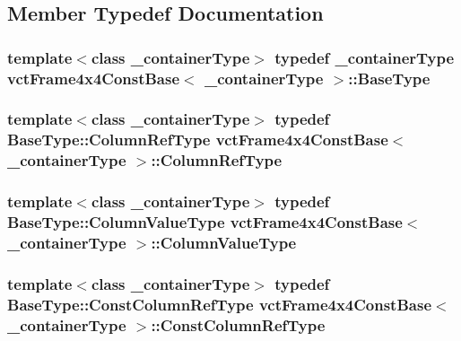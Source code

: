 \subsection{Member Typedef Documentation}
\hypertarget{classvct_frame4x4_const_base_a586ce8ad04a54639cc8967a17fb3cd36}{
\subsubsection[{Base\-Type}]{\setlength{\rightskip}{0pt plus 5cm}template$<$class \-\_\-container\-Type$>$ typedef \-\_\-container\-Type {\bf vct\-Frame4x4\-Const\-Base}$<$ \-\_\-container\-Type $>$\-::{\bf Base\-Type}}}\label{classvct_frame4x4_const_base_a586ce8ad04a54639cc8967a17fb3cd36}
\hypertarget{classvct_frame4x4_const_base_aa62cf0655339f6cbbe4c0b4323fe8dcf}{
\subsubsection[{Column\-Ref\-Type}]{\setlength{\rightskip}{0pt plus 5cm}template$<$class \-\_\-container\-Type$>$ typedef Base\-Type\-::\-Column\-Ref\-Type {\bf vct\-Frame4x4\-Const\-Base}$<$ \-\_\-container\-Type $>$\-::{\bf Column\-Ref\-Type}}}\label{classvct_frame4x4_const_base_aa62cf0655339f6cbbe4c0b4323fe8dcf}
\hypertarget{classvct_frame4x4_const_base_a72db1f941fd40f1252409297c3dd0ff6}{
\subsubsection[{Column\-Value\-Type}]{\setlength{\rightskip}{0pt plus 5cm}template$<$class \-\_\-container\-Type$>$ typedef Base\-Type\-::\-Column\-Value\-Type {\bf vct\-Frame4x4\-Const\-Base}$<$ \-\_\-container\-Type $>$\-::{\bf Column\-Value\-Type}}}\label{classvct_frame4x4_const_base_a72db1f941fd40f1252409297c3dd0ff6}
\hypertarget{classvct_frame4x4_const_base_a12760de72da52fc0917ad17373d369f3}{
\subsubsection[{Const\-Column\-Ref\-Type}]{\setlength{\rightskip}{0pt plus 5cm}template$<$class \-\_\-container\-Type$>$ typedef Base\-Type\-::\-Const\-Column\-Ref\-Type {\bf vct\-Frame4x4\-Const\-Base}$<$ \-\_\-container\-Type $>$\-::{\bf Const\-Column\-Ref\-Type}}}\label{classvct_frame4x4_const_base_a12760de72da52fc0917ad17373d369f3}
